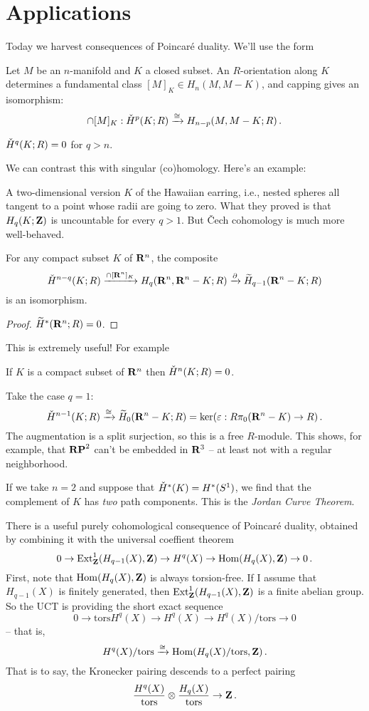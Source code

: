 \section{Applications}
Today we harvest consequences of Poincar\'e duality. We'll use the form
\begin{theorem}
Let $M$ be an $n$-manifold and $K$ a closed subset.
An $R$-orientation along $K$ determines a fundamental class
$[M]_K\in H_n(M,M-K)$, and capping gives an isomorphism:
\[
\cap[M]_K:\check{H}^p(K;R)\xrightarrow{\cong}H_{n-p}(M,M-K;R)\,.
\]
\end{theorem}
\begin{corollary}
$\check{H}^q(K;R)=0$ for $q>n$.
\end{corollary}
We can contrast this with singular (co)homology. Here's an example:
\begin{example}
A two-dimensional version $K$ of the Hawaiian earring, i.e., nested spheres all tangent to a point whose radii are going to zero. What they proved is that $H_q(K;\mathbf Z)$ is uncountable for every $q>1$. But \v{C}ech cohomology is much more
well-behaved.
\end{example}
\begin{theorem}
For any compact subset $K$ of $\mathbf R^n$, the composite
\[
\check{H}^{n-q}(K;R)\xrightarrow{\cap[\mathbf R^n]_K}H_q(\mathbf R^n,\mathbf R^n-K;R)
\xrightarrow{\partial}\widetilde{H}_{q-1}(\mathbf R^n-K;R)
\]
is an isomorphism.
\end{theorem}
\begin{proof} $\widetilde H^*(\mathbf R^n;R)=0$. \end{proof}
This is extremely useful! For example
\begin{corollary}
If $K$ is a compact subset of $\mathbf R^n$ then $\check{H}^n(K;R)=0$. 
\end{corollary}
\begin{example}
Take the case $q=1$:
\[
\check{H}^{n-1}(K;R)\xrightarrow{\cong}\widetilde{H}_0(\mathbf R^n-K;R)
=\ker(\varepsilon:R\pi_0(\mathbf R^n-K)\to R)\,.
\]
The augmentation is a split surjection, so this is a free $R$-module.
This shows, for example, that $\mathbf{RP}^2$ can't be embedded in $\mathbf R^3$ -- at least
not with a regular neighborhood. 

If we take $n=2$ and suppose that $\check{H}^*(K)=H^*(S^1)$, we find that the 
complement of $K$ has {\em two} path components. This is the 
{\em Jordan Curve Theorem}.
\end{example}
There is a useful purely cohomological consequence of Poincar\'e duality,
obtained by combining it with the universal coeffient theorem
\[
0\to\operatorname{Ext}^1_\mathbf Z(H_{q-1}(X),\mathbf Z)\to H^q(X)\to\operatorname{Hom}(H_q(X),\mathbf Z)\to 0\,.
\]
First, note that $\operatorname{Hom}(H_q(X),\mathbf Z)$ is always torsion-free. If I assume that $H_{q-1}(X)$ is finitely generated, then $\operatorname{Ext}^1_\mathbf Z(H_{q-1}(X),\mathbf Z)$ is a finite abelian group. So the UCT is providing the short exact sequence
\[
0\to\mathrm{tors}H^q(X)\to H^q(X)\to H^q(X)/\mathrm{tors}\to0
\]
-- that is, 
\[
H^q(X)/\mathrm{tors}\xrightarrow{\cong}\operatorname{Hom}(H_q(X)/\mathrm{tors},\mathbf Z)\,.
\]
That is to say, the Kronecker pairing descends to a perfect pairing
\[
\frac{H^q(X)}{\mathrm{tors}}\otimes\frac{H_q(X)}{\mathrm{tors}}\to\mathbf Z\,.
\]

